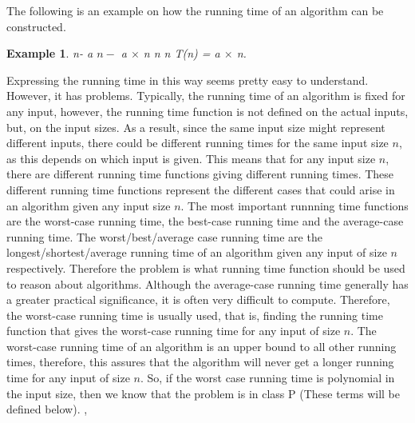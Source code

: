 \documentclass{article}
\newtheorem{example}[definition]{Example}
\begin{document}
The following is an example on how the running time of an algorithm can be constructed.
\begin{example}
\label{example_running}
{} n-{{}} a {} $\mathit{n-}${} a $\times$ n {} n {} n {} T(n) = a $\times$ n. {}
\end{example}
Expressing the running time in this way seems pretty easy to understand. However, it has problems. Typically, the running time of an algorithm is fixed for any input, however, the running time function is not defined on the actual inputs, but, on the input sizes. As a result, since the same input size might represent different inputs, there could be different running times for the same input size $\mathit{n}$, as this depends on which input is given. This means that for any input size $\mathit{n}$, there are different running time functions giving different running times. These different running time functions represent the different cases that could arise in an algorithm given any input size $\mathit{n}$. The most important runnning time functions are the worst-case running time, the best-case running time and the average-case running time. The worst/best/average case running time are the longest/shortest/average running time of an algorithm given any input of size $\mathit{n}$ respectively. Therefore the problem is what running time function should be used to reason about algorithms. Although the average-case running time generally has a greater practical significance, it is often very difficult to compute. Therefore, the worst-case running time is usually used, that is, finding the running time function that gives the worst-case running time for any input of size $\mathit{n}$. The worst-case running time of an algorithm is an upper bound to all other running times, therefore, this assures that the algorithm will never get a longer running time for any input of size $\mathit{n}$. So, if the worst case running time is polynomial in the input size, then we know that the problem is in class P (These terms will be defined below).  \cite{cormen_leiserson_rivest_stein}, \cite{adamchik_2009}\\\\
\end{document}
